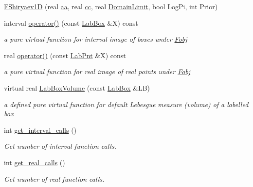 \begin{DoxyCompactItemize}
\item 
\hyperlink{classFShiryaev1D_a777dc6438cdc40a0c93dedfc491900f3}{\-F\-Shiryaev1\-D} (real \hyperlink{classFShiryaev1D_a6ad03231ef56eaa821a14088c28e5301}{aa}, real \hyperlink{classFShiryaev1D_a60d3bffaae43ec10e8204ba1bed5f708}{cc}, real \hyperlink{LevyFobj2D_8cpp_ae28a2599911ae746bc33211d3ea52aaf}{\-Domain\-Limit}, bool \-Log\-Pi, int \-Prior)
\item 
interval \hyperlink{classFShiryaev1D_a8e4ea007da7c37a1491f56fe663b7437}{operator()} (const \hyperlink{classLabBox}{\-Lab\-Box} \&\-X) const 
\begin{DoxyCompactList}\small\item\em a pure virtual function for interval image of boxes under \hyperlink{classFobj}{\-Fobj} \end{DoxyCompactList}\item 
real \hyperlink{classFShiryaev1D_af6742131d4d7acf6327d757a112b35ee}{operator()} (const \hyperlink{classLabPnt}{\-Lab\-Pnt} \&\-X) const 
\begin{DoxyCompactList}\small\item\em a pure virtual function for real image of real points under \hyperlink{classFobj}{\-Fobj} \end{DoxyCompactList}\item 
virtual real \hyperlink{classFShiryaev1D_a18052485756b302b7ac397355f6fc48c}{\-Lab\-Box\-Volume} (const \hyperlink{classLabBox}{\-Lab\-Box} \&\-L\-B)
\begin{DoxyCompactList}\small\item\em a defined pure virtual function for default \-Lebesgue measure (volume) of a labelled box \end{DoxyCompactList}\item 
int \hyperlink{classFShiryaev1D_a3012ae56329e3f2e9bf34cec1db2aceb}{get\-\_\-interval\-\_\-calls} ()
\begin{DoxyCompactList}\small\item\em \-Get number of interval function calls. \end{DoxyCompactList}\item 
int \hyperlink{classFShiryaev1D_a893357913c92294604f237dcb1117a6c}{get\-\_\-real\-\_\-calls} ()
\begin{DoxyCompactList}\small\item\em \-Get number of real function calls. \end{DoxyCompactList}\end{DoxyCompactItemize}
